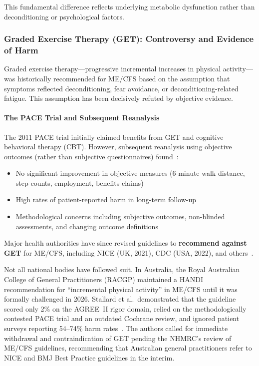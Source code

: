 This fundamental difference reflects underlying metabolic dysfunction rather than deconditioning or psychological factors.

\subsubsection{Graded Exercise Therapy (GET): Controversy and Evidence of Harm}

Graded exercise therapy---progressive incremental increases in physical activity---was historically recommended for ME/CFS based on the assumption that symptoms reflected deconditioning, fear avoidance, or deconditioning-related fatigue. This assumption has been decisively refuted by objective evidence.

\paragraph{The PACE Trial and Subsequent Reanalysis}

The 2011 PACE trial initially claimed benefits from GET and cognitive behavioral therapy (CBT). However, subsequent reanalysis using objective outcomes (rather than subjective questionnaires) found~\cite{Wilshire2018, geraghty2019cognitive}:
\begin{itemize}
    \item No significant improvement in objective measures (6-minute walk distance, step counts, employment, benefits claims)
    \item High rates of patient-reported harm in long-term follow-up
    \item Methodological concerns including subjective outcomes, non-blinded assessments, and changing outcome definitions
\end{itemize}

Major health authorities have since revised guidelines to \textbf{recommend against GET} for ME/CFS, including NICE (UK, 2021), CDC (USA, 2022), and others~\cite{NICE2021mecfs}.

Not all national bodies have followed suit. In Australia, the Royal Australian College of General Practitioners (RACGP) maintained a HANDI recommendation for ``incremental physical activity'' in ME/CFS until it was formally challenged in 2026. Stallard et al.\ demonstrated that the guideline scored only 2\% on the AGREE~II rigor domain, relied on the methodologically contested PACE trial and an outdated Cochrane review, and ignored patient surveys reporting 54--74\% harm rates~\cite{Stallard2026handi}. The authors called for immediate withdrawal and contraindication of GET pending the NHMRC's review of ME/CFS guidelines, recommending that Australian general practitioners refer to NICE and BMJ Best Practice guidelines in the interim.

